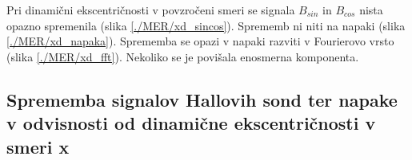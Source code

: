Pri dinamični ekscentričnosti v povzročeni smeri se signala $B_{sin}$ in $B_{cos}$ nista opazno spremenila (slika \ref{./MER/xd_sincos}). Sprememb ni niti na napaki (slika \ref{./MER/xd_napaka}). Sprememba se opazi v  napaki razviti v Fourierovo vrsto (slika \ref{./MER/xd_fft}). Nekoliko se je povišala enosmerna komponenta.
\subsection{Sprememba signalov Hallovih sond ter napake v odvisnosti od dinamične ekscentričnosti v smeri x}

